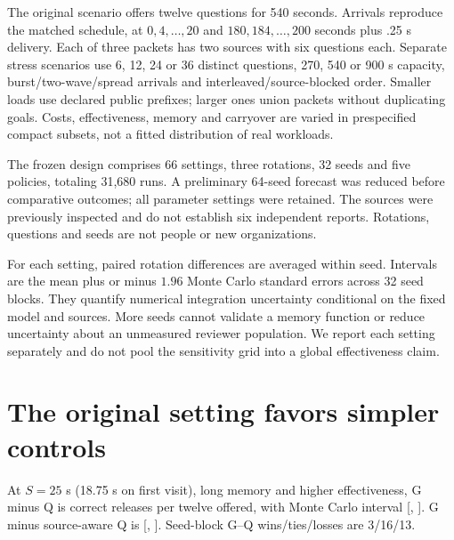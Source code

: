 \documentclass[10pt,a4paper]{article}
\begin{document}
The original scenario offers twelve questions for 540 seconds. Arrivals reproduce
the matched schedule, at $0,4,\ldots,20$ and $180,184,\ldots,200$ seconds plus .25 s
delivery. Each of three packets has two sources with six questions each.
Separate stress scenarios use 6, 12, 24 or 36 distinct questions, 270, 540 or 900 s
capacity, burst/two-wave/spread arrivals and interleaved/source-blocked order.
Smaller loads use declared public prefixes; larger ones union packets without
duplicating goals. Costs, effectiveness, memory and carryover are varied in
prespecified compact subsets, not a fitted distribution of real workloads.

The frozen design comprises 66 settings, three rotations, 32 seeds and five
policies, totaling 31,680 runs. A preliminary 64-seed forecast was reduced before
comparative outcomes; all parameter settings were retained. The sources were
previously inspected and do not establish six independent reports. Rotations,
questions and seeds are not people or new organizations.

For each setting, paired rotation differences are averaged within seed. Intervals
are the mean plus or minus $1.96$ Monte Carlo standard errors across 32 seed
blocks. They quantify numerical integration uncertainty conditional on the fixed
model and sources. More seeds cannot validate a memory function or reduce
uncertainty about an unmeasured reviewer population. We report each setting
separately and do not pool the sensitivity grid into a global effectiveness claim.

\section{The original setting favors simpler controls}
At $S=25$ s (18.75 s on first visit), long memory and higher effectiveness, G minus Q is
\PrimaryDelta{} correct releases per twelve offered, with Monte Carlo interval
[\PrimaryLow, \PrimaryHigh]. G minus source-aware Q is \ControlDelta{}
[\ControlLow, \ControlHigh]. Seed-block G--Q wins/ties/losses are 3/16/13.
\end{document}
